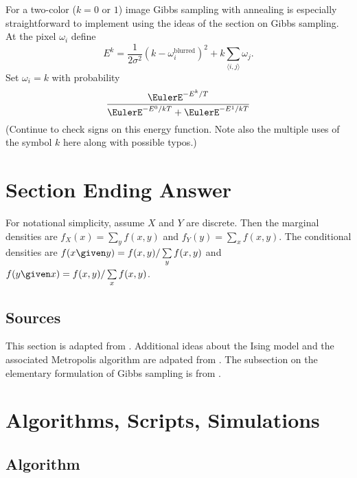 \documentclass[12pt]{article}
\begin{document}
For a two-color ($k = 0$ or $1$) image Gibbs sampling with annealing is especially straightforward
to implement using the ideas of the section on Gibbs sampling.  At the
pixel $\omega_i$ define
\[
    E^k = \frac{1}{2 \sigma^2}( k - \omega_i^{\text{blurred}})^2 + k
    \sum\limits_{\langle i,j\rangle} \omega_j.
  \]
  Set $\omega_i = k$ with probability
  \[
    \frac{\EulerE^{-E^k/T}}{\EulerE^{-E^0/kT} + \EulerE^{-E^1/kT}}
  \]
(Continue to check signs on this
energy function.  Note also the multiple uses of the symbol $k$ here
along with possible typos.)  
  
\section*{Section Ending Answer}

For notational simplicity, assume \( X \) and \( Y \) are discrete.
Then the marginal densities are \( f_X(x) = \sum\limits_y f(x,y) \) and \(
f_Y(y) = \sum_x f(x,y) \).  The conditional densities are \( f(x \given
y) = f(x,y)/\sum\limits_y f(x,y) \) and \( f(y \given x) = f(x,y)/\sum\limits_x
f(x,y) \).

\subsection*{Sources}

This section is adapted from
\cite{richey10}.  Additional ideas about the Ising model and the
associated Metropolis algorithm are adpated from
\cite{schlusser18}.  The subsection on the elementary formulation of
Gibbs sampling is from
\cite{casella92}.

\hr

\section*{Algorithms, Scripts, Simulations}

\subsection*{Algorithm}
\end{document}
